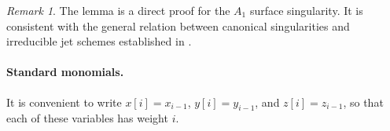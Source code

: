 \documentclass[11pt]{amsart}
\theoremstyle{definition}
\theoremstyle{remark}
\newtheorem{remark}[theorem]{Remark}
\DeclareMathOperator{\Spec}{Spec}
\begin{document}

\begin{remark}
The lemma is a direct proof for the $A_1$ surface singularity. It is
consistent with the general relation between canonical singularities
and irreducible jet schemes established in \cite{Mus}.
\end{remark}

\paragraph{Standard monomials.}

It is convenient to write $x[i]=x_{i-1}$, $y[i]=y_{i-1}$, and
$z[i]=z_{i-1}$, so that each of these variables has weight $i$.
\end{document}
